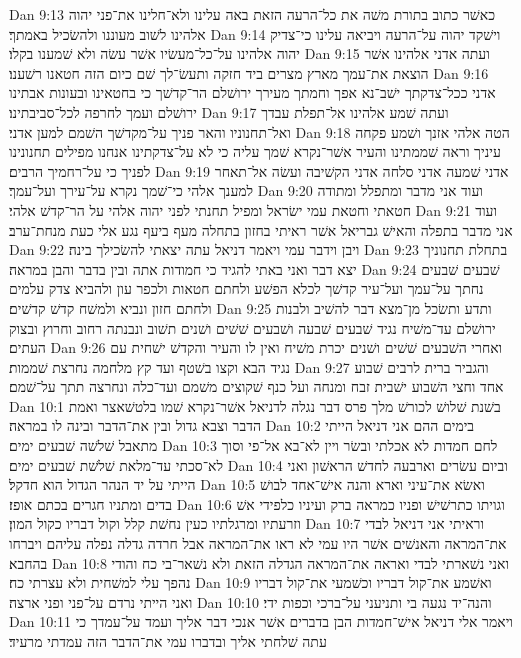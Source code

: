 Dan 9:13  כאשׁר כתוב בתורת משׁה את כל־הרעה הזאת באה עלינו ולא־חלינו את־פני יהוה אלהינו לשׁוב מעוננו ולהשׂכיל באמתך׃
Dan 9:14  וישׁקד יהוה על־הרעה ויביאה עלינו כי־צדיק יהוה אלהינו על־כל־מעשׂיו אשׁר עשׂה ולא שׁמענו בקלו׃
Dan 9:15  ועתה אדני אלהינו אשׁר הוצאת את־עמך מארץ מצרים ביד חזקה ותעשׂ־לך שׁם כיום הזה חטאנו רשׁענו׃
Dan 9:16  אדני ככל־צדקתך ישׁב־נא אפך וחמתך מעירך ירושׁלם הר־קדשׁך כי בחטאינו ובעונות אבתינו ירושׁלם ועמך לחרפה לכל־סביבתינו׃
Dan 9:17  ועתה שׁמע אלהינו אל־תפלת עבדך ואל־תחנוניו והאר פניך על־מקדשׁך השׁמם למען אדני׃
Dan 9:18  הטה אלהי אזנך ושׁמע פקחה עיניך וראה שׁממתינו והעיר אשׁר־נקרא שׁמך עליה כי לא על־צדקתינו אנחנו מפילים תחנונינו לפניך כי על־רחמיך הרבים׃
Dan 9:19  אדני שׁמעה אדני סלחה אדני הקשׁיבה ועשׂה אל־תאחר למענך אלהי כי־שׁמך נקרא על־עירך ועל־עמך׃
Dan 9:20  ועוד אני מדבר ומתפלל ומתודה חטאתי וחטאת עמי ישׂראל ומפיל תחנתי לפני יהוה אלהי על הר־קדשׁ אלהי׃
Dan 9:21  ועוד אני מדבר בתפלה והאישׁ גבריאל אשׁר ראיתי בחזון בתחלה מעף ביעף נגע אלי כעת מנחת־ערב׃
Dan 9:22  ויבן וידבר עמי ויאמר דניאל עתה יצאתי להשׂכילך בינה׃
Dan 9:23  בתחלת תחנוניך יצא דבר ואני באתי להגיד כי חמודות אתה ובין בדבר והבן במראה׃
Dan 9:24  שׁבעים שׁבעים נחתך על־עמך ועל־עיר קדשׁך לכלא הפשׁע ולחתם חטאות ולכפר עון ולהביא צדק עלמים ולחתם חזון ונביא ולמשׁח קדשׁ קדשׁים׃
Dan 9:25  ותדע ותשׂכל מן־מצא דבר להשׁיב ולבנות ירושׁלם עד־משׁיח נגיד שׁבעים שׁבעה ושׁבעים שׁשׁים ושׁנים תשׁוב ונבנתה רחוב וחרוץ ובצוק העתים׃
Dan 9:26  ואחרי השׁבעים שׁשׁים ושׁנים יכרת משׁיח ואין לו והעיר והקדשׁ ישׁחית עם נגיד הבא וקצו בשׁטף ועד קץ מלחמה נחרצת שׁממות׃
Dan 9:27  והגביר ברית לרבים שׁבוע אחד וחצי השׁבוע ישׁבית זבח ומנחה ועל כנף שׁקוצים משׁמם ועד־כלה ונחרצה תתך על־שׁמם׃
Dan 10:1  בשׁנת שׁלושׁ לכורשׁ מלך פרס דבר נגלה לדניאל אשׁר־נקרא שׁמו בלטשׁאצר ואמת הדבר וצבא גדול ובין את־הדבר ובינה לו במראה׃
Dan 10:2  בימים ההם אני דניאל הייתי מתאבל שׁלשׁה שׁבעים ימים׃
Dan 10:3  לחם חמדות לא אכלתי ובשׂר ויין לא־בא אל־פי וסוך לא־סכתי עד־מלאת שׁלשׁת שׁבעים ימים׃
Dan 10:4  וביום עשׂרים וארבעה לחדשׁ הראשׁון ואני הייתי על יד הנהר הגדול הוא חדקל׃
Dan 10:5  ואשׂא את־עיני וארא והנה אישׁ־אחד לבושׁ בדים ומתניו חגרים בכתם אופז׃
Dan 10:6  וגויתו כתרשׁישׁ ופניו כמראה ברק ועיניו כלפידי אשׁ וזרעתיו ומרגלתיו כעין נחשׁת קלל וקול דבריו כקול המון׃
Dan 10:7  וראיתי אני דניאל לבדי את־המראה והאנשׁים אשׁר היו עמי לא ראו את־המראה אבל חרדה גדלה נפלה עליהם ויברחו בהחבא׃
Dan 10:8  ואני נשׁארתי לבדי ואראה את־המראה הגדלה הזאת ולא נשׁאר־בי כח והודי נהפך עלי למשׁחית ולא עצרתי כח׃
Dan 10:9  ואשׁמע את־קול דבריו וכשׁמעי את־קול דבריו ואני הייתי נרדם על־פני ופני ארצה׃
Dan 10:10  והנה־יד נגעה בי ותניעני על־ברכי וכפות ידי׃
Dan 10:11  ויאמר אלי דניאל אישׁ־חמדות הבן בדברים אשׁר אנכי דבר אליך ועמד על־עמדך כי עתה שׁלחתי אליך ובדברו עמי את־הדבר הזה עמדתי מרעיד׃
